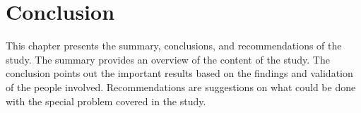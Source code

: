 \chapter{Conclusion}
This chapter presents the summary, conclusions, and recommendations of the study. The summary provides an overview of the content of the study. The conclusion points out the important results based on the findings and validation of the people involved. Recommendations are suggestions on what could be done with the special problem covered in the study.